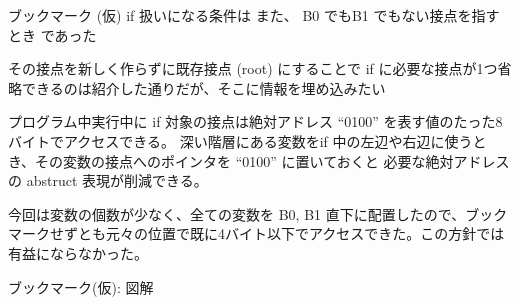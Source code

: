 \documentclass[12pt,unicode]{beamer}
\begin{document}
\begin{frame}{ブックマーク (仮)}
   if 扱いになる条件は また、 B0 でもB1 でもない接点を指すとき であった

   その接点を新しく作らずに既存接点 (root) にすることで if に必要な接点が1つ省略できるのは紹介した通りだが、そこに情報を埋め込みたい

   プログラム中実行中に if 対象の接点は絶対アドレス  ``0100'' を表す値のたった8バイトでアクセスできる。
   深い階層にある変数をif 中の左辺や右辺に使うとき、その変数の接点へのポインタを ``0100'' に置いておくと 必要な絶対アドレスの abstruct 表現が削減できる。

   今回は変数の個数が少なく、全ての変数を B0, B1 直下に配置したので、ブックマークせずとも元々の位置で既に4バイト以下でアクセスできた。この方針では有益にならなかった。
\end{frame}

\begin{frame}{ブックマーク(仮): 図解}
   \quad
\end{frame}
\end{document}
